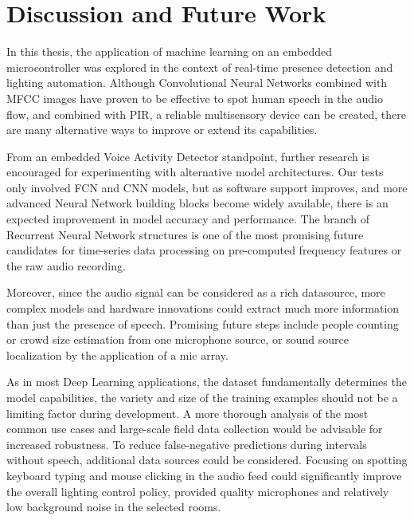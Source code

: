 \chapter{Discussion and Future Work}
\label{chapter:discussion}



In this thesis, the application of machine learning on an embedded microcontroller was explored in the context of real-time presence detection and lighting automation. Although Convolutional Neural Networks combined with MFCC images have proven to be effective to spot human speech in the audio flow, and combined with PIR, a reliable multisensory device can be created, there are many alternative ways to improve or extend its capabilities.

From an embedded Voice Activity Detector standpoint, further research is encouraged for experimenting with alternative model architectures. Our tests only involved FCN and CNN models, but as software support improves, and more advanced Neural Network building blocks become widely available, there is an expected improvement in model accuracy and performance. The branch of Recurrent Neural Network structures is one of the most promising future candidates for time-series data processing on pre-computed frequency features or the raw audio recording.


Moreover, since the audio signal can be considered as a rich datasource, more complex models and hardware innovations could extract much more information than just the presence of speech. Promising future steps include people counting or crowd size estimation from one microphone source, or sound source localization by the application of a mic array.

As in most Deep Learning applications, the dataset fundamentally determines the model capabilities, the variety and size of the training examples should not be a limiting factor during development. A more thorough analysis of the most common use cases and large-scale field data collection would be advisable for increased robustness. To reduce false-negative predictions during intervals without speech, additional data sources could be considered. Focusing on spotting keyboard typing and mouse clicking in the audio feed could significantly improve the overall lighting control policy, provided quality microphones and relatively low background noise in the selected rooms.  


